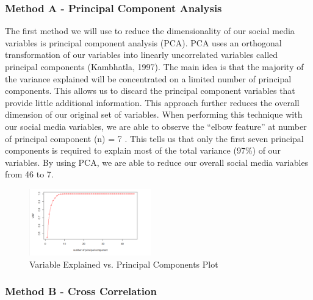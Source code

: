 \documentclass[12pt,oneside]{chicagocapstone}
\begin{document}
\hypertarget{method-a---principal-component-analysis}{%
\subsubsection*{Method A - Principal Component Analysis}\label{method-a---principal-component-analysis}}

The first method we will use to reduce the dimensionality of our social media variables is principal component analysis (PCA). PCA uses an orthogonal transformation of our variables into linearly uncorrelated variables called principal components (Kambhatla, 1997). The main idea is that the majority of the variance explained will be concentrated on a limited number of principal components. This allows us to discard the principal component variables that provide little additional information. This approach further reduces the overall dimension of our original set of variables. When performing this technique with our social media variables, we are able to observe the ``elbow feature'' at number of principal component (n) = 7 . This tells us that only the first seven principal components is required to explain most of the total variance (97\%) of our variables. By using PCA, we are able to reduce our overall social media variables from 46 to 7.
\begin{figure}

{\centering \includegraphics[width=200px,angle = 0, scale=2.1]{figure/pca} 

}

\caption{Variable Explained vs. Principal Components Plot}\label{fig:pca}
\end{figure}
\hypertarget{method-b---cross-correlation}{%
\subsubsection*{Method B - Cross Correlation}\label{method-b---cross-correlation}}
\end{document}
